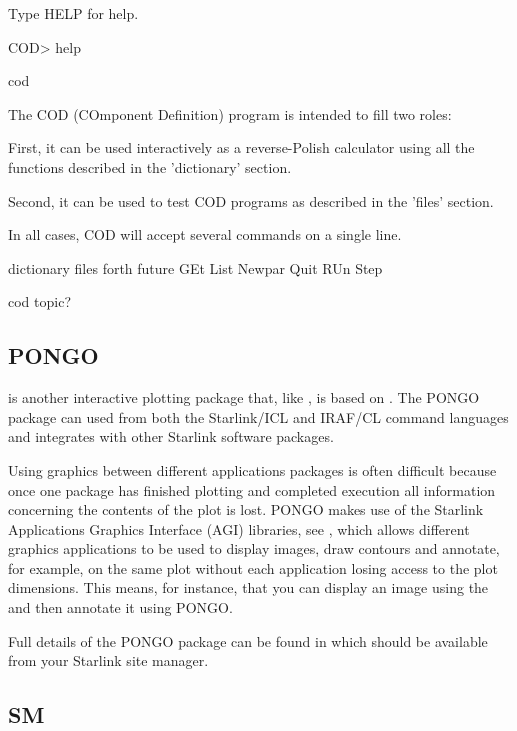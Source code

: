 \documentclass[twoside,11pt]{starlink}
\begin{document}
\begin{small}
\begin{terminalv}
 Type HELP for help.

COD> help

 cod

The COD (COmponent Definition) program is intended to fill two roles:

First, it can be used interactively as a reverse-Polish calculator
using all the functions described in the 'dictionary' section.

Second, it can be used to test COD programs as described in the 'files'
section.

In all cases, COD will accept several commands on a single line.


dictionary   files        forth        future       GEt          List
Newpar       Quit         RUn          Step

cod topic?
\end{terminalv}
\end{small}

\subsection{PONGO\label{sc15_pongo}}

 is another interactive plotting package that,
like , is based on
. The PONGO package can used from both
the Starlink/ICL and IRAF/CL command languages and integrates with
other Starlink software packages.

Using graphics between different applications packages is often
difficult because once one package has finished plotting and completed
execution all information concerning the contents of the plot is lost.
PONGO makes use of the Starlink Applications Graphics Interface (AGI)
libraries, see , which allows different graphics
applications to be used to display images, draw contours and annotate,
for example, on the same plot without each application losing access
to the plot dimensions. This means, for instance, that you can display
an image using the   and then annotate it using PONGO.

Full details of the PONGO package can be found in
 which should be available from your Starlink
site manager.

\subsection{SM\label{sc15_sm}}
\end{document}
